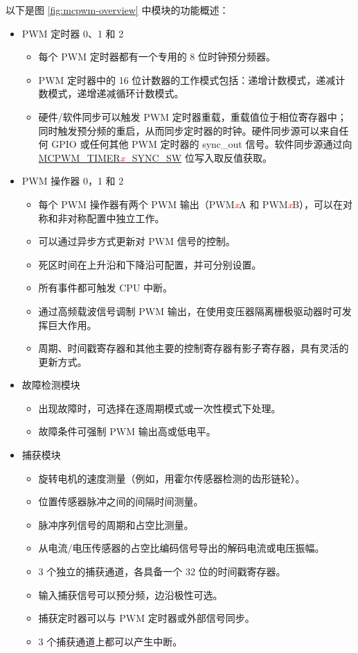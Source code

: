 \documentclass[main\_\_CN.tex]{subfiles}
\begin{document}
以下是图 \ref{fig:mcpwm-overview} 中模块的功能概述：

\begin{itemize}
    \item PWM 定时器 0、1 和 2
        \begin{itemize}
            \item 每个 PWM 定时器都有一个专用的 8 位时钟预分频器。
            \item PWM 定时器中的 16 位计数器的工作模式包括：递增计数模式，递减计数模式，递增递减循环计数模式。
            \item 硬件/软件同步可以触发 PWM 定时器重载，重载值位于相位寄存器中；同时触发预分频的重启，从而同步定时器的时钟。硬件同步源可以来自任何 GPIO 或任何其他 PWM 定时器的 sync\_out 信号。软件同步源通过向 \hyperref[fielddesc:MCPWMTIMER0SYNCSW]{MCPWM\_TIMER\textcolor{red}{\it{x}}\_SYNC\_SW} 位写入取反值获取。
        \end{itemize}
    \item PWM 操作器 0，1 和 2
        \begin{itemize}
            \item 每个 PWM 操作器有两个 PWM 输出（PWM\textcolor{red}{\it{x}}A 和 PWM\textcolor{red}{\it{x}}B），可以在对称和非对称配置中独立工作。
            \item 可以通过异步方式更新对 PWM 信号的控制。
            \item 死区时间在上升沿和下降沿可配置，并可分别设置。
            \item 所有事件都可触发 CPU 中断。
            \item 通过高频载波信号调制 PWM 输出，在使用变压器隔离栅极驱动器时可发挥巨大作用。
            \item 周期、时间戳寄存器和其他主要的控制寄存器有影子寄存器，具有灵活的更新方式。
        \end{itemize}
    \item 故障检测模块
        \begin{itemize}
            \item 出现故障时，可选择在逐周期模式或一次性模式下处理。
            \item 故障条件可强制 PWM 输出高或低电平。
        \end{itemize}
    \item 捕获模块
        \begin{itemize}
            \item 旋转电机的速度测量（例如，用霍尔传感器检测的齿形链轮）。
            \item 位置传感器脉冲之间的间隔时间测量。
            \item 脉冲序列信号的周期和占空比测量。
            \item 从电流/电压传感器的占空比编码信号导出的解码电流或电压振幅。
            \item 3 个独立的捕获通道，各具备一个 32 位的时间戳寄存器。
            \item 输入捕获信号可以预分频，边沿极性可选。
            \item 捕获定时器可以与 PWM 定时器或外部信号同步。
            \item 3 个捕获通道上都可以产生中断。
        \end{itemize}
\end{itemize}
\clearpage
\end{document}
